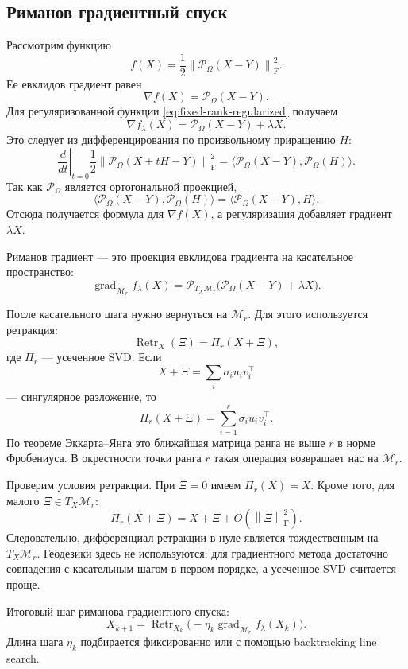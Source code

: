 \documentclass[a4paper,12pt]{article}
\newcommand{\fro}[1]{\left\lVert #1 \right\rVert_{\mathrm F}}
\newcommand{\grad}{\operatorname{grad}}
\renewcommand{\Proj}{\mathcal{P}}
\newcommand{\Mcal}{\mathcal{M}}
\newcommand{\Retr}{\operatorname{Retr}}
\begin{document}
\subsection{Риманов градиентный спуск}

Рассмотрим функцию
\[
f(X)=\frac12\fro{\Proj_\Omega(X-Y)}^2.
\]
Ее евклидов градиент равен
\[
\nabla f(X)=\Proj_\Omega(X-Y).
\]
Для регуляризованной функции \eqref{eq:fixed-rank-regularized} получаем
\[
\nabla f_\lambda(X)=\Proj_\Omega(X-Y)+\lambda X.
\]
Это следует из дифференцирования по произвольному приращению $H$:
\[
\left.\frac{d}{dt}\right|_{t=0}
\frac12\fro{\Proj_\Omega(X+tH-Y)}^2
=
\langle \Proj_\Omega(X-Y),\Proj_\Omega(H)\rangle.
\]
Так как $\Proj_\Omega$ является ортогональной проекцией,
\[
\langle \Proj_\Omega(X-Y),\Proj_\Omega(H)\rangle
=
\langle \Proj_\Omega(X-Y),H\rangle.
\]
Отсюда получается формула для $\nabla f(X)$, а регуляризация добавляет градиент $\lambda X$.

Риманов градиент --- это проекция евклидова градиента на касательное пространство:
\begin{equation}
\label{eq:riemannian-gradient-final}
\grad_{\Mcal_r} f_\lambda(X)
=
\Proj_{T_X\Mcal_r}\bigl(\Proj_\Omega(X-Y)+\lambda X\bigr).
\end{equation}

После касательного шага нужно вернуться на $\Mcal_r$. Для этого используется ретракция:
\begin{equation}
\label{eq:fixed-rank-retraction-final}
\Retr_X(\Xi)=\Pi_r(X+\Xi),
\end{equation}
где $\Pi_r$ --- усеченное SVD. Если
\[
X+\Xi=\sum_i \sigma_i u_i v_i^\top
\]
--- сингулярное разложение, то
\[
\Pi_r(X+\Xi)=\sum_{i=1}^r \sigma_i u_i v_i^\top.
\]
По теореме Эккарта--Янга это ближайшая матрица ранга не выше $r$ в норме Фробениуса. В окрестности точки ранга $r$ такая операция возвращает нас на $\Mcal_r$.

Проверим условия ретракции. При $\Xi=0$ имеем $\Pi_r(X)=X$. Кроме того, для малого $\Xi\in T_X\Mcal_r$:
\[
\Pi_r(X+\Xi)=X+\Xi+O(\fro{\Xi}^2).
\]
Следовательно, дифференциал ретракции в нуле является тождественным на $T_X\Mcal_r$. Геодезики здесь не используются: для градиентного метода достаточно совпадения с касательным шагом в первом порядке, а усеченное SVD считается проще.

Итоговый шаг риманова градиентного спуска:
\begin{equation}
\label{eq:rgd-final}
X_{k+1}
=
\Retr_{X_k}\bigl(-\eta_k\grad_{\Mcal_r} f_\lambda(X_k)\bigr).
\end{equation}
Длина шага $\eta_k$ подбирается фиксированно или с помощью backtracking line search.
\end{document}
